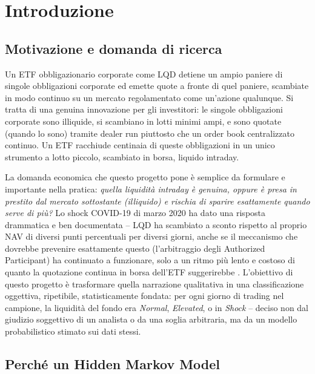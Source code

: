 \documentclass[11pt]{article}
\theoremstyle{definition}
\theoremstyle{remark}
\begin{document}
\newpage
\tableofcontents
\newpage

\section{Introduzione}
\label{sec:intro}

\subsection{Motivazione e domanda di ricerca}

Un ETF obbligazionario corporate come LQD detiene un ampio paniere di singole obbligazioni corporate ed emette quote a fronte di quel paniere, scambiate in modo continuo su un mercato regolamentato come un'azione qualunque. Si tratta di una genuina innovazione per gli investitori: le singole obbligazioni corporate sono illiquide, si scambiano in lotti minimi ampi, e sono quotate (quando lo sono) tramite dealer run piuttosto che un order book centralizzato continuo. Un ETF racchiude centinaia di queste obbligazioni in un unico strumento a lotto piccolo, scambiato in borsa, liquido intraday.

La domanda economica che questo progetto pone \`e semplice da formulare e importante nella pratica: \emph{quella liquidit\`a intraday \`e genuina, oppure \`e presa in prestito dal mercato sottostante (illiquido) e rischia di sparire esattamente quando serve di pi\`u?} Lo shock COVID-19 di marzo 2020 ha dato una risposta drammatica e ben documentata -- LQD ha scambiato a sconto rispetto al proprio NAV di diversi punti percentuali per diversi giorni, anche se il meccanismo che dovrebbe prevenire esattamente questo (l'arbitraggio degli Authorized Participant) ha continuato a funzionare, solo a un ritmo pi\`u lento e costoso di quanto la quotazione continua in borsa dell'ETF suggerirebbe \cite{ohara2021anatomy}. L'obiettivo di questo progetto \`e trasformare quella narrazione qualitativa in una classificazione oggettiva, ripetibile, statisticamente fondata: per ogni giorno di trading nel campione, la liquidit\`a del fondo era \emph{Normal}, \emph{Elevated}, o in \emph{Shock} -- deciso non dal giudizio soggettivo di un analista o da una soglia arbitraria, ma da un modello probabilistico stimato sui dati stessi.

\subsection{Perch\'e un Hidden Markov Model}
\end{document}
